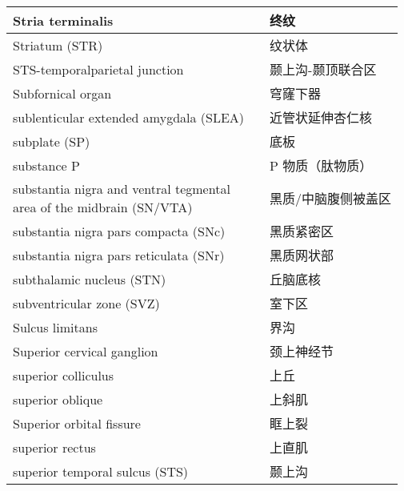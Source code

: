 \begin{longtable}{lll}
	\midrule
	Stria terminalis  && 终纹 \\
	
	\midrule
	Striatum (STR)  && 纹状体 \\
	
	\midrule
	STS-temporalparietal junction   && 颞上沟-颞顶联合区 \\
	
	\midrule
	Subfornical organ   && 穹窿下器 \\
	
	\midrule
	sublenticular extended amygdala (SLEA)   && 近管状延伸杏仁核 \\
	
	\midrule
	subplate (SP)   && 底板 \\
	
	\midrule
	substance P   && P 物质（肽物质） \\
	
	\midrule
	\makecell{substantia nigra and ventral tegmental \\area of the midbrain (SN/VTA)}   && 黑质/中脑腹侧被盖区 \\
	
	\midrule
	substantia nigra pars compacta (SNc)  && 黑质紧密区 \\
	
	\midrule
	substantia nigra pars reticulata (SNr)  && 黑质网状部 \\
	
	\midrule
	subthalamic nucleus (STN)   && 丘脑底核 \\
	
	\midrule
	subventricular zone (SVZ)   && 室下区 \\
	
	\midrule
	Sulcus limitans   && 界沟 \\
	
	\midrule
	Superior cervical ganglion   && 颈上神经节 \\
	
	\midrule
	superior colliculus   && 上丘 \\
	
	\midrule
	superior oblique   && 上斜肌 \\
	
	\midrule
	Superior orbital fissure   && 眶上裂 \\
	
	\midrule
	superior rectus   && 上直肌 \\
	
	\midrule
	superior temporal sulcus (STS)   && 颞上沟 \\
	

\end{longtable}
